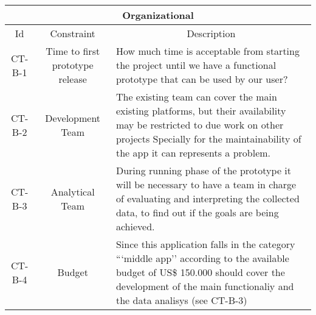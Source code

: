\begin{table}[H]
    \begin{tabularx}{\textwidth}{|c|c|X|}
        \hline
        \multicolumn{3}{c}{\textbf{Organizational}} \\
        \hline
        \toprule
        \multicolumn{1}{c}{Id} & \multicolumn{1}{c}{Constraint} & \multicolumn{1}{c}{Description} \\
        \midrule
        CT-B-1 & Time to first prototype release & How much time is acceptable from starting the project
        until we have a functional prototype that can be used by our user? \\
        CT-B-2 & Development Team & The existing team can cover the main existing platforms, but their availability
        may be restricted to due work on other projects Specially for the maintainability of the app it can represents
        a problem. \\
        CT-B-3 & Analytical Team & During running phase of the prototype it will be necessary to have a team in charge
        of evaluating and interpreting the collected data, to find out if the goals are being achieved. \\
        CT-B-4 & Budget & Since this application falls in the category ```middle app'' according to \cite{refonline:SPDLOAD}
        the available budget of US\$ 150.000 should cover the development of the main functionaliy and the data analisys 
        (see CT-B-3) \\
        \bottomrule
    \end{tabularx}
\end{table}












